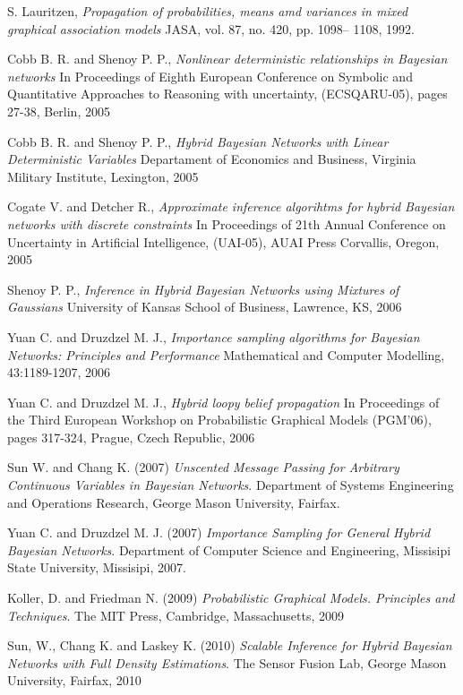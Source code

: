 \documentclass[a4paper,11pt]{article}
\begin{document}

\begin{thebibliography}{}

S. Lauritzen, \textit{Propagation of probabilities, means amd variances in mixed graphical association models} JASA, vol. 87, no. 420, pp. 1098– 1108, 1992.

Cobb B. R. and Shenoy P. P., \textit{Nonlinear deterministic relationships in Bayesian networks} In Proceedings of Eighth European Conference on Symbolic and Quantitative Approaches to Reasoning with uncertainty, (ECSQARU-05), pages 27-38, Berlin, 2005

Cobb B. R. and Shenoy P. P., \textit{Hybrid Bayesian Networks with Linear Deterministic Variables} Departament of Economics and Business, Virginia Military Institute, Lexington, 2005

Cogate V. and Detcher R., \textit{Approximate inference algorihtms for hybrid Bayesian networks with discrete constraints} In Proceedings of 21th Annual Conference on Uncertainty in Artificial Intelligence, (UAI-05), AUAI Press Corvallis, Oregon, 2005

Shenoy P. P., \textit{Inference in Hybrid Bayesian Networks using Mixtures of Gaussians} University of Kansas School of Business, Lawrence, KS, 2006

Yuan C. and Druzdzel M. J., \textit{Importance sampling algorithms for Bayesian Networks: Principles and Performance} Mathematical and Computer Modelling, 43:1189-1207, 2006

Yuan C. and Druzdzel M. J., \textit{Hybrid loopy belief propagation} In Proceedings of the Third European Workshop on Probabilistic Graphical Models (PGM'06), pages 317-324, Prague, Czech Republic, 2006

Sun W. and Chang K. (2007) \textit{Unscented Message Passing for Arbitrary Continuous Variables in Bayesian Networks}. Department of Systems Engineering and Operations Research, George Mason University, Fairfax.

Yuan C. and Druzdzel M. J. (2007) \textit{Importance Sampling for General Hybrid Bayesian Networks}. Department of Computer Science and Engineering, Missisipi State University, Missisipi, 2007.

Koller, D. and Friedman N. (2009) \textit{Probabilistic Graphical Models. Principles and Techniques}. The MIT Press, Cambridge, Massachusetts, 2009

Sun, W., Chang K. and Laskey K. (2010) \textit{Scalable Inference for Hybrid Bayesian Networks with Full Density Estimations}. The Sensor Fusion Lab, George Mason University, Fairfax, 2010


\end{thebibliography}
\end{document}
